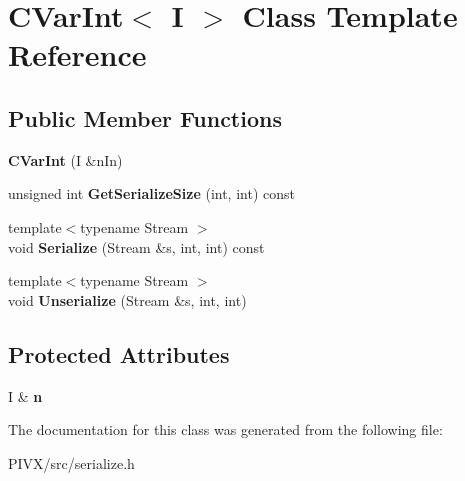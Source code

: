 \hypertarget{class_c_var_int}{}\section{C\+Var\+Int$<$ I $>$ Class Template Reference}
\label{class_c_var_int}
\subsection*{Public Member Functions}
\begin{DoxyCompactItemize}
\item 
\mbox{\label{class_c_var_int_ab26b9de1b43d4b9ce844eaa7cf6a6b4f}} 
{\bfseries C\+Var\+Int} (I \&n\+In)
\item 
\mbox{\label{class_c_var_int_af994978b1b95a6b5d3009f5743ca6053}} 
unsigned int {\bfseries Get\+Serialize\+Size} (int, int) const
\item 
\mbox{\label{class_c_var_int_a3b772eba5c6cd5b9ad7cec9cb45f7cb2}} 
{\footnotesize template$<$typename Stream $>$ }\\void {\bfseries Serialize} (Stream \&s, int, int) const
\item 
\mbox{\label{class_c_var_int_aba87b78443378273b4f335dcd858c29c}} 
{\footnotesize template$<$typename Stream $>$ }\\void {\bfseries Unserialize} (Stream \&s, int, int)
\end{DoxyCompactItemize}
\subsection*{Protected Attributes}
\begin{DoxyCompactItemize}
\item 
\mbox{\label{class_c_var_int_a4514adc82b41754d9ac22ee627744614}} 
I \& {\bfseries n}
\end{DoxyCompactItemize}


The documentation for this class was generated from the following file\+:\begin{DoxyCompactItemize}
\item 
P\+I\+V\+X/src/serialize.\+h\end{DoxyCompactItemize}
